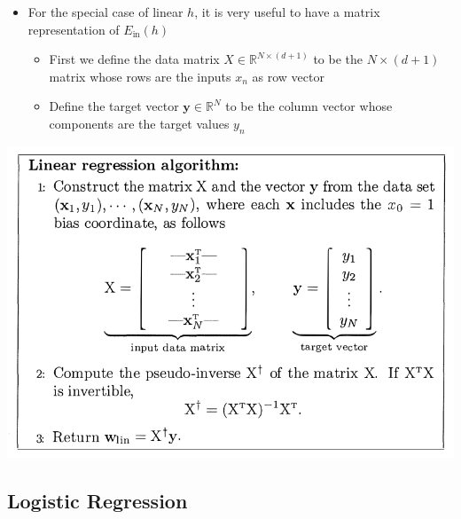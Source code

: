 \documentclass[11pt]{article}
\begin{document}
\begin{itemize}
\item For the special case of linear \(h\), it is very useful to have a matrix representation of \(E_\text{in}(h)\)
\begin{itemize}
\item First we define the data matrix \(X \in \mathbb R^{N \times (d+1)}\) to be the \(N \times (d+1)\) matrix whose rows are the inputs \(x_n\) as row vector
\item Define the target vector \(\pmb y \in \mathbb R^N\) to be the column vector whose components are the target values \(y_n\)
\end{itemize}
\end{itemize}

\begin{center}
\includegraphics[width=.9\linewidth]{The Linear Model/screenshot_2018-08-28_14-54-58.png}
\end{center}
\subsection{Logistic Regression}
\label{sec:orgfddaa36}
\end{document}
